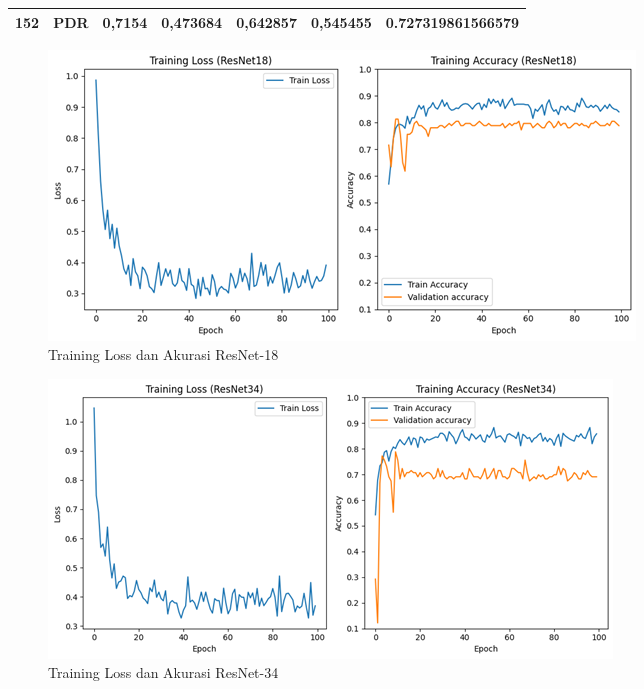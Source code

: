 \begin{table}[hbtp]
\begin{center}
\begin{tabular}{|c|l|c|l|l|l|c|}
            \multirow{-3}{*}{152} & PDR                                                & \multirow{-3}{*}{0,7154} & 0,473684                                          & 0,642857                                         & 0,545455                                        & \multirow{-3}{*}{0.727319861566579}  \\ \hline
            \end{tabular}
        \end{center}
    \end{table}

    \begin{figure}[hbtp]
        \centering
        \includegraphics[scale=0.8]{gambar/TrainingGraphResNet18class-weighted.png}
        \caption{Training Loss dan Akurasi ResNet-18}
        \label{Img:GraphResNet18}
    \end{figure}
    \begin{figure}[hbtp]
        \centering
        \includegraphics[scale=0.85]{gambar/TrainingGraphResNet34class-weighted.png}
        \caption{Training Loss dan Akurasi ResNet-34}
        \label{Img:GraphResNet34}
    \end{figure}
